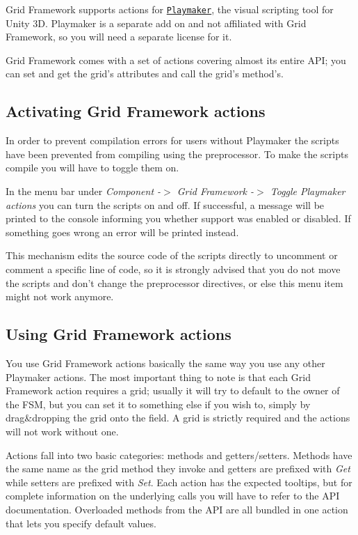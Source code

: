 Grid Framework supports actions for \href{http://hutonggames.com/index.html}{\tt Playmaker}, the visual scripting tool for Unity 3\+D. Playmaker is a separate add on and not affiliated with Grid Framework, so you will need a separate license for it.

Grid Framework comes with a set of actions covering almost its entire A\+P\+I; you can set and get the grid's attributes and call the grid's method's.

\subsection*{Activating Grid Framework actions }

In order to prevent compilation errors for users without Playmaker the scripts have been prevented from compiling using the preprocessor. To make the scripts compile you will have to toggle them on.

In the menu bar under {\itshape Component -\/$>$ Grid Framework -\/$>$ Toggle Playmaker actions} you can turn the scripts on and off. If successful, a message will be printed to the console informing you whether support was enabled or disabled. If something goes wrong an error will be printed instead.

This mechanism edits the source code of the scripts directly to uncomment or comment a specific line of code, so it is strongly advised that you do not move the scripts and don't change the preprocessor directives, or else this menu item might not work anymore.

\subsection*{Using Grid Framework actions }

You use Grid Framework actions basically the same way you use any other Playmaker actions. The most important thing to note is that each Grid Framework action requires a grid; usually it will try to default to the owner of the F\+S\+M, but you can set it to something else if you wish to, simply by drag\&dropping the grid onto the field. A grid is strictly required and the actions will not work without one.

Actions fall into two basic categories\+: methods and getters/setters. Methods have the same name as the grid method they invoke and getters are prefixed with {\itshape Get} while setters are prefixed with {\itshape Set}. Each action has the expected tooltips, but for complete information on the underlying calls you will have to refer to the A\+P\+I documentation. Overloaded methods from the A\+P\+I are all bundled in one action that lets you specify default values.

